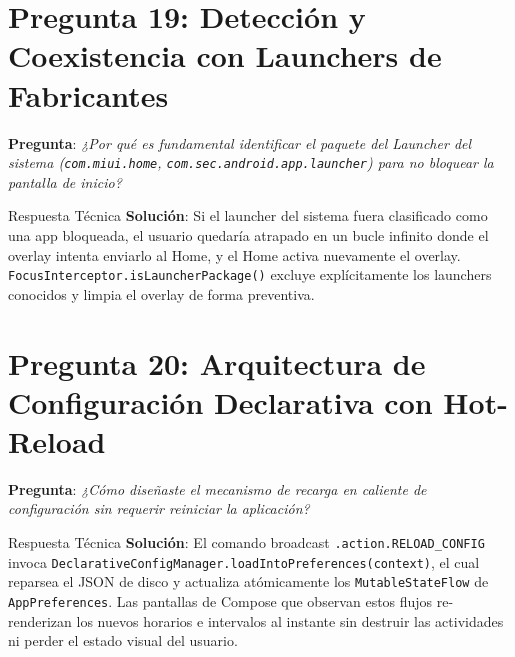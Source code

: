 \documentclass[11pt,a4paper,oneside]{report}
\begin{document}
\section{Pregunta 19: Detección y Coexistencia con Launchers de Fabricantes}
\textbf{Pregunta}: \textit{¿Por qué es fundamental identificar el paquete del Launcher del sistema (\texttt{com.miui.home}, \texttt{com.sec.android.app.launcher}) para no bloquear la pantalla de inicio?}
\begin{starbox}{Respuesta Técnica}
\textbf{Solución}: Si el launcher del sistema fuera clasificado como una app bloqueada, el usuario quedaría atrapado en un bucle infinito donde el overlay intenta enviarlo al Home, y el Home activa nuevamente el overlay. \texttt{FocusInterceptor.isLauncherPackage()} excluye explícitamente los launchers conocidos y limpia el overlay de forma preventiva.
\end{starbox}

\section{Pregunta 20: Arquitectura de Configuración Declarativa con Hot-Reload}
\textbf{Pregunta}: \textit{¿Cómo diseñaste el mecanismo de recarga en caliente de configuración sin requerir reiniciar la aplicación?}
\begin{starbox}{Respuesta Técnica}
\textbf{Solución}: El comando broadcast \texttt{.action.RELOAD\_CONFIG} invoca \texttt{DeclarativeConfigManager.loadIntoPreferences(context)}, el cual reparsea el JSON de disco y actualiza atómicamente los \texttt{MutableStateFlow} de \texttt{AppPreferences}. Las pantallas de Compose que observan estos flujos re-renderizan los nuevos horarios e intervalos al instante sin destruir las actividades ni perder el estado visual del usuario.
\end{starbox}

\newpage
\end{document}
